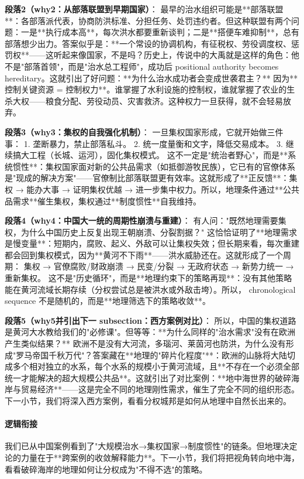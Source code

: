 \documentclass[openany, a4paper, 12pt]{book}
\begin{document}
	\textbf{段落2（why2：从部落联盟到早期国家）}：  
	最早的治水组织可能是**部落联盟**：各部落派代表，协商防洪标准、分担任务、处罚违约者。但这种联盟有两个问题：一是**执行成本高**，每次洪水都要重新谈判；二是**搭便车难抑制**，总有部落想少出力。答案似乎是：**一个常设的协调机构，有征税权、劳役调度权、惩罚权**——这听起来像国家，不是吗？历史上，传说中的大禹就是这样的角色：他不是"部落首领"，而是"治水总工程师"，成功后 positional authority becomes hereditary。这就引出了好问题：**为什么治水成功者会变成世袭君主？** 因为**控制关键资源 = 控制权力**。谁掌握了水利设施的控制权，谁就掌握了农业的生杀大权——粮食分配、劳役动员、灾害救济。这种权力一旦获得，就不会轻易放弃。
	
	\textbf{段落3（why3：集权的自我强化机制）}：  
	一旦集权国家形成，它就开始做三件事：  
    1. 垄断暴力，禁止部落私斗。  
    2. 统一度量衡和文字，降低交易成本。  
    3. 继续搞大工程（长城、运河），固化集权模式。  
    这不一定是"统治者野心"，而是**系统惯性**：集权国家面对新的公共品需求（如抵御游牧民族），它已有的官僚体系是"现成的解决方案"——官僚制比部落联盟更有效率。这就形成了**正反馈**：集权 → 能办大事 → 证明集权优越 → 进一步集中权力。所以，地理条件通过**公共品需求**催生集权，集权通过**制度惯性**自我维持。
	
	\textbf{段落4（why4：中国大一统的周期性崩溃与重建）}：  
	有人问："既然地理需要集权，为什么中国历史上反复出现王朝崩溃、分裂割据？" 这恰恰证明了**地理需求是慢变量**：短期内，腐败、起义、外敌可以让集权失效；但长期来看，每次重建都会回到集权模式，因为**黄河不下雨**——洪水威胁还在。这就形成了一个周期：  
    集权 → 官僚腐败/财政崩溃 → 民变/分裂 → 无政府状态 → 新势力统一 → 重新集权。  
    这不是"历史循环"，而是**地理约束下的策略再现**：没有其他策略能在黄河流域长期存续（分权尝试总是被洪水或外敌击垮）。所以， chronological sequence 不是随机的，而是**地理筛选下的策略收敛**。
	
	\textbf{段落5（why5并引出下一 subsection：西方案例对比）}：  
	所以，中国的集权道路是黄河大水教给我们的"必修课"。但等等：**为什么同样的"治水需求"没有在欧洲产生类似结果？** 欧洲不是没有大河流，多瑙河、莱茵河也防洪，为什么没有形成"罗马帝国千秋万代"？答案藏在**地理的"碎片化程度"**：欧洲的山脉将大陆切成多个相对独立的水系，每个水系的规模小于黄河流域，且**不存在一个必须全部统一才能解决的超大规模公共品**。这就引出了对比案例：**地中海世界的破碎海岸与贸易经济**——这是完全不同的地理刚性需求，催生了完全不同的组织形态。下一小节，我们将深入西方案例，看看分权城邦是如何从地理中自然长出来的。
	
	\paragraph*{逻辑衔接}
	我们已从中国案例看到了"大规模治水→集权国家→制度惯性"的链条。但地理决定论的力量在于**跨案例的收敛解释能力**。下一小节，我们将把视角转向地中海，看看破碎海岸的地理如何让分权成为"不得不选"的策略。
	
\end{document}
